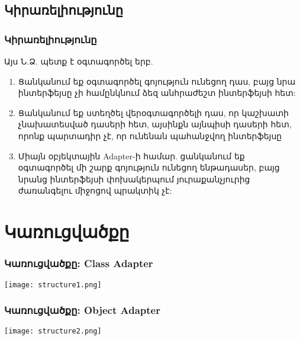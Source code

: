 \documentclass{beamer}
\begin{document}
\subsection{Կիրառելիությունը}
\begin{frame}\frametitle{Կիրառելիությունը}
Այս Ն.Ձ. պետք է օգտագործել երբ.
\vfill
\begin{enumerate}
    \item Ցանկանում եք օգտագործել գոյություն ունեցող դաս, բայց նրա ինտերֆեյսը չի
    համընկնում ձեզ անհրաժեշտ ինտերֆեյսի հետ: \pause \vfill
    \item Ցանկանում եք ստեղծել վերօգտագործելի դաս, որ կաշխատի չնախատեսված
    դասերի հետ, այսինքն այնպիսի դասերի հետ, որոնք պարտադիր չէ, որ ունենան
    պահանջվող ինտերֆեյսը \pause \vfill
    \item Միայն օբյեկտային Adapter-ի համար. ցանկանում եք օգտագործել մի շարք
    գոյություն ունեցող ենթադասեր, բայց նրանց ինտերֆեյսի փոխակերպում յուրաքանչյուրից
    ժառանգելու միջոցով պրակտիկ չէ:
\end{enumerate}
\end{frame}

\section{Կառուցվածքը}
\begin{frame}\frametitle{Կառուցվածքը: Class Adapter}
\begin{center}
    \texttt{[image: structure1.png]}
\end{center}
\end{frame}

\begin{frame}\frametitle{Կառուցվածքը: Object Adapter}
\begin{center}
    \texttt{[image: structure2.png]}
\end{center}
\end{frame}
\end{document}

